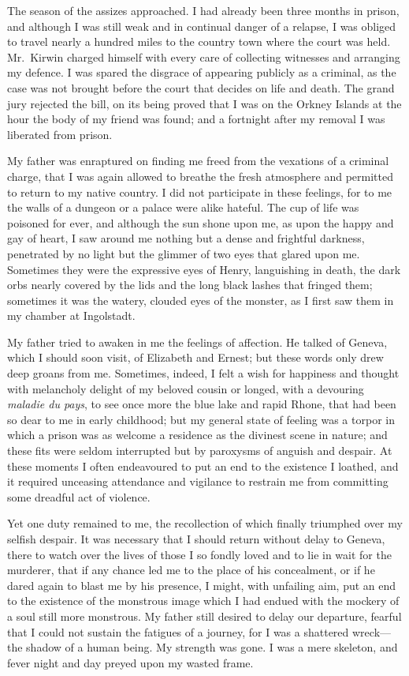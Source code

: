 \documentclass[12pt,openright]{book}
\begin{document}
The season of the assizes approached. I had already been three months in prison, and although I was still weak and in continual danger of a relapse, I was obliged to travel nearly a hundred miles to the country town where the court was held. Mr. Kirwin charged himself with every care of collecting witnesses and arranging my defence. I was spared the disgrace of appearing publicly as a criminal, as the case was not brought before the court that decides on life and death. The grand jury rejected the bill, on its being proved that I was on the Orkney Islands at the hour the body of my friend was found; and a fortnight after my removal I was liberated from prison.

My father was enraptured on finding me freed from the vexations of a criminal charge, that I was again allowed to breathe the fresh atmosphere and permitted to return to my native country. I did not participate in these feelings, for to me the walls of a dungeon or a palace were alike hateful. The cup of life was poisoned for ever, and although the sun shone upon me, as upon the happy and gay of heart, I saw around me nothing but a dense and frightful darkness, penetrated by no light but the glimmer of two eyes that glared upon me. Sometimes they were the expressive eyes of Henry, languishing in death, the dark orbs nearly covered by the lids and the long black lashes that fringed them; sometimes it was the watery, clouded eyes of the monster, as I first saw them in my chamber at Ingolstadt.

My father tried to awaken in me the feelings of affection. He talked of Geneva, which I should soon visit, of Elizabeth and Ernest; but these words only drew deep groans from me. Sometimes, indeed, I felt a wish for happiness and thought with melancholy delight of my beloved cousin or longed, with a devouring \textit{maladie du pays}, to see once more the blue lake and rapid Rhone, that had been so dear to me in early childhood; but my general state of feeling was a torpor in which a prison was as welcome a residence as the divinest scene in nature; and these fits were seldom interrupted but by paroxysms of anguish and despair. At these moments I often endeavoured to put an end to the existence I loathed, and it required unceasing attendance and vigilance to restrain me from committing some dreadful act of violence.

Yet one duty remained to me, the recollection of which finally triumphed over my selfish despair. It was necessary that I should return without delay to Geneva, there to watch over the lives of those I so fondly loved and to lie in wait for the murderer, that if any chance led me to the place of his concealment, or if he dared again to blast me by his presence, I might, with unfailing aim, put an end to the existence of the monstrous image which I had endued with the mockery of a soul still more monstrous. My father still desired to delay our departure, fearful that I could not sustain the fatigues of a journey, for I was a shattered wreck—the shadow of a human being. My strength was gone. I was a mere skeleton, and fever night and day preyed upon my wasted frame.
\end{document}

